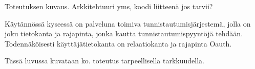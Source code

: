 Toteutuksen kuvaus. Arkkitehtuuri yms, koodi liitteenä jos tarvii?

Käytännössä kyseessä on palveluna toimiva tunnistautumisjärjestemä, jolla on joku tietokanta ja rajapinta, jonka kautta tunnistautumispyyntöjä tehdään. Todennäköisesti käyttäjätietokanta on relaatiokanta ja rajapinta Oauth.

Tässä luvussa kuvataan ko. toteutus tarpeellisella tarkkuudella.